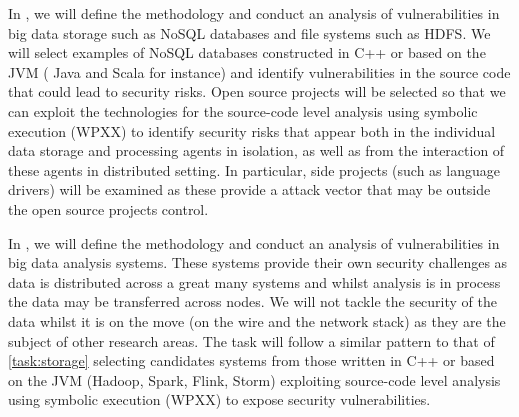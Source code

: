 \begin{Workpackage}{\thewpno}
\begin{Task}
\TaskResults{%
}
\TaskHeader{}
In \theTask, we will define the methodology and conduct an analysis of vulnerabilities in big data storage such as NoSQL databases and file systems such as HDFS.  We will select examples of  NoSQL databases constructed in C++ or  based on the JVM ( Java and Scala for instance) and identify vulnerabilities in the source code that could lead to security risks. Open source projects will be selected so that we can exploit the technologies for the source-code level analysis using symbolic execution (WPXX) to identify security risks that appear both in the individual data storage and processing agents in isolation, as well as from the interaction of these agents in distributed setting. In particular, side projects (such as language drivers) will be examined as these provide a attack vector that may be outside the open source projects control. 
 \end{Task}

 \begin{Task}
 
 \TaskResults{%
 }
 \TaskHeader{}
 In \theTask, we will define the methodology and conduct an analysis of vulnerabilities in big data analysis systems.  These systems provide their own security challenges as data is distributed across a great many systems and whilst analysis is in process the data may be transferred across nodes.  We will not tackle the security of the data whilst it is on the move (on the wire and the network stack) as they are the subject of other research areas.  The task will follow a similar pattern to that of \ref{task:storage} selecting candidates systems from those written in C++ or based on the JVM (Hadoop, Spark, Flink, Storm) exploiting source-code level analysis using symbolic execution (WPXX) to expose security vulnerabilities.
\end{Task}
 
\begin{Task}
  

\end{Task}
\end{Workpackage}

